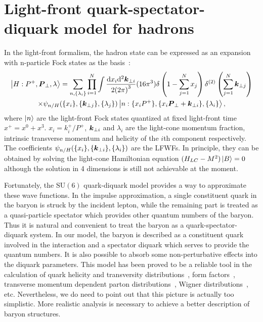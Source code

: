 \documentclass[aps,prc,preprint,groupedaddress,showpacs,superscriptaddress,floatfix]{revtex4-1}
\newcommand{\diff}{\ensuremath\mathrm{d}}
\renewcommand{\vec}[1]{\ensuremath\boldsymbol{#1}}
\begin{document}
\section{Light-front quark-spectator-diquark model for hadrons\label{sec:model}}
In the light-front formalism, the hadron state can be expressed as an expansion with n-particle Fock states as the basis~\cite{brodsky_quantum_1998}:
%
\begin{multline}
  \Ket{H: P^+, \vec{P}_\perp, \lambda} = \sum_{n,\{\lambda_i\}} \prod^N_{i=1} \int
  \frac{\diff x_i \diff^2 \vec{k}_{\perp i}}{2{(2\pi)}^3 } (16\pi^3)
  \delta \left(1-\sum_{j=1}^N x_j \right) \delta^{(2)} \left( \sum_{j=1}^N \vec{k}_{\perp j} \right) \\
  \times \psi_{n/H} ( \{x_i\}, \{\vec{k}_{\perp j} \}, \{\lambda_j\} ) \Ket{n: \{x_i P^+\}, \{x_i \vec{P}_\perp + \vec{k}_{\perp i}\}, \{\lambda_i\}},
\label{eq:expansion}
\end{multline}
%
where $\ket{n}$ are the light-front Fock states quantized at fixed light-front time $x^+ = x^0+x^3$.
$x_i=k_i^+/P^+$, $\vec{k}_{\perp i}$ and $\lambda_i$ are the light-cone momentum fraction, intrinsic transverse momentum and helicity of the $i$th component respectively.
The coefficients $\psi_{n/H}(\{x_i\}, \{\vec{k}_{\perp i}\}, \{\lambda_i\})$ are the LFWFs.
In principle, they can be obtained by solving the light-cone Hamiltonian equation $(H_{LC}-M^2)\ket{B}=0$ although the solution in 4 dimensions is still not achievable at the moment.

Fortunately, the $\mathrm{SU}(6)$ quark-diquark model provides a way to approximate these wave functions.
In the impulse approximation, a single constituent quark in the baryon is struck by the incident lepton, while the remaining part is treated as a quasi-particle spectator which provides other quantum numbers of the baryon.
Thus it is natural and convenient to treat the baryon as a quark-spectator-diquark system.
In our model, the baryon is described as a constituent quark involved in the interaction and a spectator diquark which serves to provide the quantum numbers.
It is also possible to absorb some non-perturbative effects into the diquark parameters.
This model has been proved to be a reliable tool in the calculation of quark helicity and transversity distributions~\cite{ma_x-dependent_1996,ma_quark_1998}, form factors~\cite{ma_electromagnetic_2002,ma_axial_2002,liu_generalized_2014}, transverse momentum dependent parton distributions~\cite{lu_sivers_2004}, Wigner distributions~\cite{liu_quark_2015}, etc.
Nevertheless, we do need to point out that this picture is actually too simplistic.
More realistic analysis is necessary to achieve a better description of baryon structures.
\end{document}
